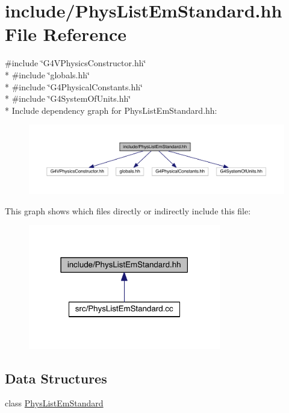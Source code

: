 \hypertarget{PhysListEmStandard_8hh}{}\section{include/\+Phys\+List\+Em\+Standard.hh File Reference}
\label{PhysListEmStandard_8hh}
{\ttfamily \#include \char`\"{}G4\+V\+Physics\+Constructor.\+hh\char`\"{}}\\*
{\ttfamily \#include \char`\"{}globals.\+hh\char`\"{}}\\*
{\ttfamily \#include \char`\"{}G4\+Physical\+Constants.\+hh\char`\"{}}\\*
{\ttfamily \#include \char`\"{}G4\+System\+Of\+Units.\+hh\char`\"{}}\\*
Include dependency graph for Phys\+List\+Em\+Standard.\+hh\+:
\nopagebreak
\begin{figure}[H]
\begin{center}
\leavevmode
\includegraphics[width=350pt]{PhysListEmStandard_8hh__incl}
\end{center}
\end{figure}
This graph shows which files directly or indirectly include this file\+:
\nopagebreak
\begin{figure}[H]
\begin{center}
\leavevmode
\includegraphics[width=238pt]{PhysListEmStandard_8hh__dep__incl}
\end{center}
\end{figure}
\subsection*{Data Structures}
\begin{DoxyCompactItemize}
\item 
class \hyperlink{classPhysListEmStandard}{Phys\+List\+Em\+Standard}
\end{DoxyCompactItemize}
